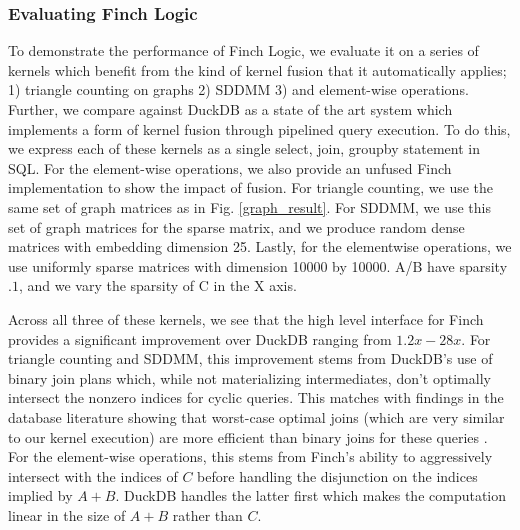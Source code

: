\subsubsection{Evaluating Finch Logic}
To demonstrate the performance of Finch Logic, we evaluate it on a series of kernels which benefit from the kind of kernel fusion that it automatically applies; 1) triangle counting on graphs 2) SDDMM 3) and element-wise operations. Further, we compare against DuckDB as a state of the art system which implements a form of kernel fusion through pipelined query execution. To do this, we express each of these kernels as a single select, join, groupby statement in SQL. For the element-wise operations, we also provide an unfused Finch implementation to show the impact of fusion. For triangle counting, we use the same set of graph matrices as in Fig. \ref{graph_result}. For SDDMM, we use this set of graph matrices for the sparse matrix, and we produce random dense matrices with embedding dimension 25. Lastly, for the elementwise operations, we use uniformly sparse matrices with dimension 10000 by 10000. A/B have sparsity $.1$, and we vary the sparsity of C in the X axis.

Across all three of these kernels, we see that the high level interface for Finch provides a significant improvement over DuckDB ranging from $1.2x-28x$. For triangle counting and SDDMM, this improvement stems from DuckDB's use of binary join plans which, while not materializing intermediates, don't optimally intersect the nonzero indices for cyclic queries. This matches with findings in the database literature showing that worst-case optimal joins (which are very similar to our kernel execution) are more efficient than binary joins for these queries \cite{wang2023free}. For the element-wise operations, this stems from Finch's ability to aggressively intersect with the indices of $C$ before handling the disjunction on the indices implied by $A+B$. DuckDB handles the latter first which makes the computation linear in the size of $A+B$ rather than $C$.

